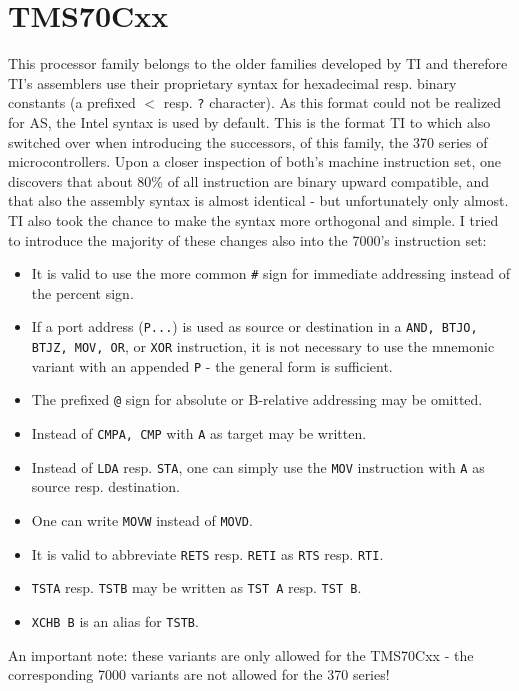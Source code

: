 \documentclass[12pt,twoside]{report}
\newcommand{\tty}[1]{{\tt #1}}
\newcommand{\asname}{{AS}}
\begin{document}

\section{TMS70Cxx}

This processor family belongs to the older families developed by TI
and therefore TI's assemblers use their proprietary syntax for
hexadecimal resp. binary constants (a prefixed $<$ resp. \tty{?} character).
As this format could not be realized for \asname{}, the Intel syntax is used
by default.  This is the format TI to which also switched over when
introducing the successors, of this family, the 370 series of
microcontrollers.  Upon a closer inspection of both's machine
instruction set, one discovers that about 80\% of all instruction are
binary upward compatible, and that also the assembly syntax is almost
identical - but unfortunately only almost.  TI also took the chance to
make the syntax more orthogonal and simple.  I tried to introduce
the majority of these changes also into the 7000's instruction set:
\begin{itemize}
\item{It is valid to use the more common \tty{\#} sign for immediate addressing
      instead of the percent sign.}
\item{If a port address (\tty{P...}) is used as source or destination in a
      \tty{AND, BTJO, BTJZ, MOV, OR}, or \tty{XOR} instruction, it is not necessary
      to use the mnemonic variant with an appended \tty{P} - the general
      form is sufficient.}
\item{The prefixed \tty{@} sign for absolute or B-relative addressing may be
      omitted.}
\item{Instead of \tty{CMPA, CMP} with \tty{A} as target may be written.}
\item{Instead of \tty{LDA} resp. \tty{STA}, one can simply use the
      \tty{MOV} instruction with \tty{A} as source resp. destination.}
\item{One can write \tty{MOVW} instead of \tty{MOVD}.}
\item{It is valid to abbreviate \tty{RETS} resp. \tty{RETI} as \tty{RTS}
      resp. \tty{RTI}.}
\item{\tty{TSTA} resp. \tty{TSTB} may be written as \tty{TST A} resp.
      \tty{TST B}.}
\item{\tty{XCHB B} is an alias for \tty{TSTB}.}
\end{itemize}
An important note: these variants are only allowed for the TMS70Cxx -
the corresponding 7000 variants are not allowed for the 370 series!
\end{document}
